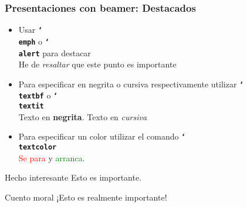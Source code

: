 \documentclass{beamer}
\newcommand{\bftt}[1]{\textbf{\texttt{#1}}}
\newcommand{\cmd}[1]{{\color[HTML]{008000}\bftt{#1}}}
\newcommand{\bs}{\char`\\}
\newcommand{\cmdbs}[1]{\cmd{\bs#1}}
\begin{document}
\begin{frame}
\frametitle{Presentaciones con beamer: Destacados}

\begin{itemize}
\item Usar \cmdbs{emph} o \cmdbs{alert} para destacar\\
He de \emph{resaltar} que este punto es \alert{importante}
\item Para especificar en negrita o cursiva respectivamente utilizar \cmdbs{textbf} o \cmdbs{textit}\\
Texto en \textbf{negrita}. Texto en \textit{cursiva}
\item Para especificar un color utilizar el comando \cmdbs{textcolor}\\
\textcolor{red}{Se para} y \textcolor{green}{arranca}.
\end{itemize}

\begin{block}{Hecho interesante}
Esto es importante.
\end{block}

\begin{alertblock}{Cuento moral}
¡Esto es realmente importante!
\end{alertblock}

\end{frame}
\end{document}
